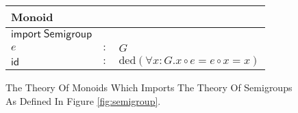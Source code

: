 \begin{figure}[h]
  \begin{center}
    \begin{tabular}{|l c l|}
      \hline
      \textsf{Monoid} & &\\\hline
      $ \mathsf{import \ Semigroup}$ &&\\
      \hline
      $e$ & $:$ & $G$\\
      $ \mathsf{id}$& $:$ & $ \text{ded}\left( \forall x : G . x\circ e = e \circ x = x\right)$\\\hline
    \end{tabular}
  \end{center}
  \caption{The Theory Of Monoids Which Imports The Theory Of Semigroups As Defined In Figure \ref{fig:semigroup}. }
  \label{fig:monoid}
\end{figure}
